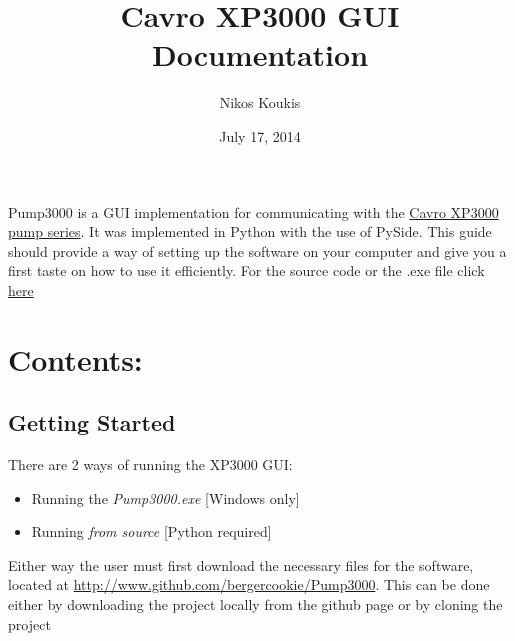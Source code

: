 \documentclass[letterpaper,10pt,english]{sphinxmanual}
\title{Cavro XP3000 GUI Documentation}
\date{July 17, 2014}
\author{Nikos Koukis}
\begin{document}
\maketitle
\tableofcontents
{}\label{index::doc}


Pump3000 is a GUI implementation for communicating with the \href{http://cladlab.com/download/electronics/teardowns/cavro-xl3000/cavro-xp3000-syringe-pump-operators-manual.pdf}{Cavro XP3000 pump series}.
It was implemented in Python with the use of PySide.
This guide should provide a way of setting up the software on your computer and
give you a first taste on how to use it efficiently.
For the source code or the .exe file click \href{http://www.github.com/bergercookie/Pump3000}{here}


\chapter{Contents:}
\label{index:guide-to-pump3000}\label{index:contents}

\section{Getting Started}
\label{getting-started:getting-started}\label{getting-started::doc}
There are 2 ways of running the XP3000 GUI:
\begin{itemize}
\item {} 
Running the \emph{Pump3000.exe} {[}Windows only{]}

\item {} 
Running \emph{from source} {[}Python required{]}

\end{itemize}

Either way the user must first download the necessary files for the software,
located at \href{http://www.github.com/bergercookie/Pump3000}{http://www.github.com/bergercookie/Pump3000}. This can be
done either by downloading the project locally from the github page or by cloning the project
\end{document}
